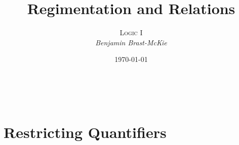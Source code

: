 \documentclass[a4paper, 11pt]{article} %
\title{\textbf{Regimentation and Relations}} %
\author{\textsc{Logic I}\\ \em Benjamin Brast-McKie} %
\date{\today} %
\makeatletter
\def\therefore{\ensuremath{\ldotp\dot{}\,\ldotp}}
\renewcommand{\maketitle}{ %
\begin{flushright} %
{\LARGE\@title} %

\vspace{10pt} %

{\@author} %
\\\@date %

\vspace{30pt} %
\end{flushright}
}
\makeatother
\begin{document}
\maketitle %

\thispagestyle{empty}


%
%
%
%
%

\section*{Restricting Quantifiers}
\end{document}

